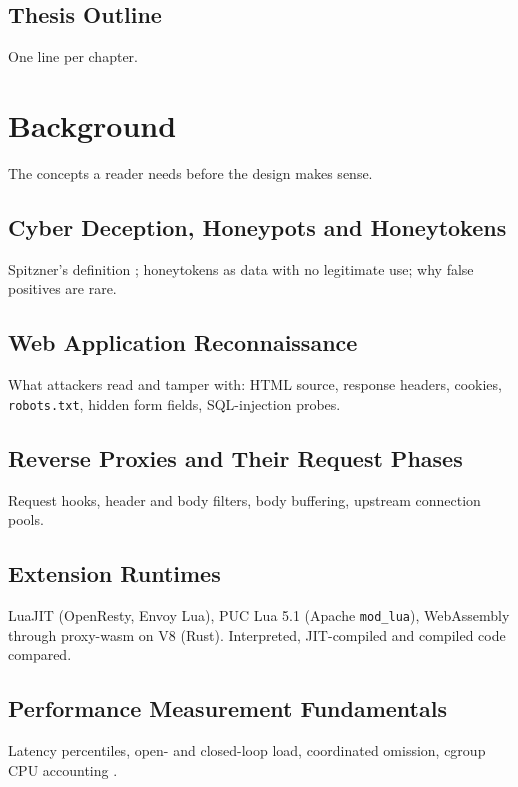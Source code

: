\documentclass{rptuma}
\begin{document}
\section{Thesis Outline}
One line per chapter.

\chapter{Background}
The concepts a reader needs before the design makes sense.

\section{Cyber Deception, Honeypots and Honeytokens}
Spitzner's definition \cite{spitzner2002honeypots,spitzner2003honeytokens}; honeytokens as data with
no legitimate use; why false positives are rare.

\section{Web Application Reconnaissance}
What attackers read and tamper with: HTML source, response headers, cookies, \texttt{robots.txt},
hidden form fields, SQL-injection probes.

\section{Reverse Proxies and Their Request Phases}
Request hooks, header and body filters, body buffering, upstream connection pools.

\section{Extension Runtimes}
LuaJIT (OpenResty, Envoy Lua), PUC Lua 5.1 (Apache \texttt{mod\_lua}), WebAssembly through
proxy-wasm on V8 (Rust). Interpreted, JIT-compiled and compiled code compared.

\section{Performance Measurement Fundamentals}
Latency percentiles, open- and closed-loop load, coordinated omission, cgroup CPU accounting
\cite{jain1991art}.

\end{document}
